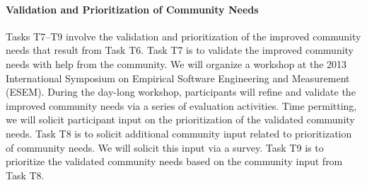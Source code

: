 \paragraph{Validation and Prioritization of Community Needs}
Tasks T7--T9 involve the validation and prioritization of the improved community needs that result from Task T6.
Task T7 is to validate the improved community needs with help from the community.
We will organize a workshop at the 2013 International Symposium on Empirical Software Engineering and Measurement (ESEM).
During the day-long workshop, participants will refine and validate the improved community needs via a series of evaluation activities.
Time permitting, we will solicit participant input on the prioritization of the validated community needs.
Task T8 is to solicit additional community input related to prioritization of community needs.
We will solicit this input via a survey. %
Task T9 is to prioritize the validated community needs based on the community input from Task T8.


